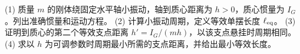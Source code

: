 (1) 质量 \(m\) 的刚体绕固定水平轴小振动，轴到质心距离为 \(h>0\)，质心惯量为 \(I_G\)。列出准确惯量和运动方程。
(2) 计算小振动周期，定义等效单摆长度 \(\ell_{\rm eq}\)。
(3) 证明到质心的第二个等效支点距离 \(h'=I_G/(mh)\)，以该支点悬挂时周期相同。
(4) 求以 \(h\) 为可调参数时周期最小所需的支点距离，并给出最小等效长度。
